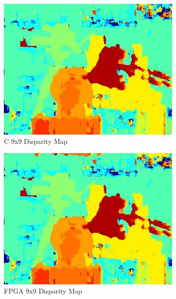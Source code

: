 \begin{figure}
\begin{center}
\begin{subfigure}{0.45\textwidth}
		\includegraphics[width=\textwidth]{figures/tsukuba_c_9x9.png}
		\caption{C 9x9 Disparity Map}
		\label{fig:tsukubaC9x9}
	\end{subfigure}
	\begin{subfigure}{0.45\textwidth}
		\includegraphics[width=\textwidth]{figures/tsukuba_9x9_fpga.png}
		\caption{FPGA 9x9 Disparity Map}
		\label{fig:tsukubaFPGA9x9}
	\end{subfigure}
	\\
	\begin{subfigure}{0.45\textwidth}

\end{subfigure}
\end{center}
\end{figure}
